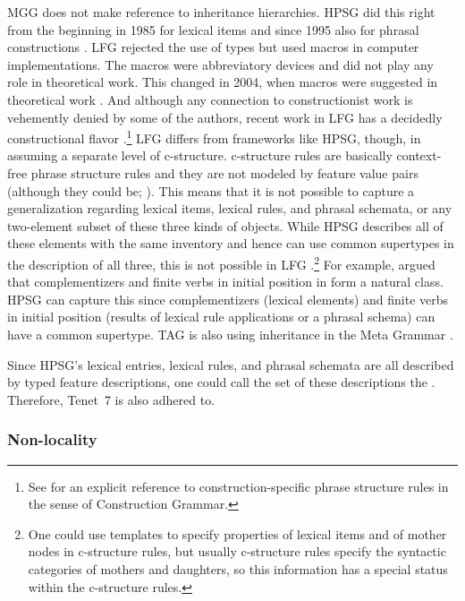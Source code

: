 \documentclass[output=paper
	        ,collection
	        ,collectionchapter
 	        ,biblatex
                ,babelshorthands
                ,newtxmath
                ,draftmode
                ,colorlinks, citecolor=brown
]{langscibook}
\begin{document}
MGG does not make reference to inheritance hierarchies. HPSG did this right from the beginning in 1985 \citep{FPW85a} for lexical items and
since 1995 also for phrasal constructions \citep{Sag97a}. LFG rejected the use of types but used
macros in computer implementations. The macros were abbreviatory devices and did not play any role in
theoretical work. This changed in 2004, when macros were suggested in theoretical work
\citep*{DKK2004a}. And although any connection to constructionist work is vehemently denied by some
of the authors, recent work in LFG has a decidedly constructional flavor
\citep*{ADT2008a,AGT2014a}.\footnote{
  See  for an explicit reference to construction-specific phrase
  structure rules in the sense of Construction Grammar.
}
LFG differs from frameworks like HPSG, though, in assuming a separate level of
c-structure. c-structure rules are basically context-free phrase structure rules and they are not
modeled by feature value pairs (although they could be; \citealt{Kaplan95a}). This means that it is not
possible to capture a generalization regarding lexical items, lexical rules, and phrasal
schemata, or any two-element subset of these three kinds of objects. While HPSG describes all of
these elements with the same inventory and hence can use common supertypes in the description of all
three, this is not possible in LFG \citep[Section~23.1]{MuellerGT-Eng2}.\footnote{
  One could use templates \citep{DKK2004a,ADT2013a} to specify properties of lexical items and of mother nodes in c-structure
  rules, but usually c-structure rules specify the syntactic categories of mothers and daughters, so
  this information has a special status within the c-structure rules.
} For example, \citet{Hoehle97a} argued that
complementizers and finite verbs in initial position in  form a natural class. HPSG can
capture this since complementizers (lexical elements) and finite verbs in initial position (results
of lexical rule applications or a phrasal schema) can have a common supertype.
TAG is also using inheritance in the Meta Grammar \citep{LK2017a}.

Since HPSG's lexical entries, lexical rules, and phrasal schemata are all described by typed feature
descriptions, one could call the set of these descriptions the . Therefore,
Tenet~7 is also adhered to. 

\subsubsection{Non-locality}
\label{sec-non-locality}
\end{document}
